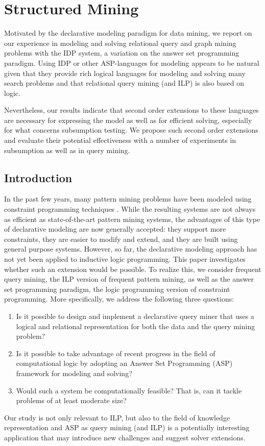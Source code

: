 \chapter{Structured Mining}\label{ch:StructuredMining}
  Motivated by the declarative modeling paradigm for data mining, we report on our experience in modeling and solving relational query and graph mining problems with the IDP system, a variation on the answer set programming paradigm. Using IDP or other ASP-languages for modeling appears to be natural given that they provide rich logical languages for modeling and solving many search problems and that relational query mining (and ILP) is also based on logic.

  Nevertheless, our results indicate that second order extensions to these languages are necessary for expressing the model as well as for efficient solving, especially for what concerns subsumption testing. We propose such second order extensions and evaluate their potential effectiveness with a number of experiments in subsumption as well as in query mining.




\section{Introduction}
\label{sec:intro}
In the past few years, many pattern mining problems have been modeled using constraint programming techniques \parencite{guns_framework}.
While the resulting systems are not always as efficient as state-of-the-art pattern mining systems,
the advantages of this type of declarative modeling are  now generally accepted: they support more constraints,
they are easier to modify and extend, and they are built using general purpose systems.
However, so far, the declarative modeling approach has not yet been applied to inductive logic programming. This paper investigates whether such 
an extension would be possible.  To realize this, we consider frequent query mining, the ILP version of frequent pattern mining, as well as the answer set programming paradigm, the logic programming version of constraint programming. 
More specifically, we address the following three questions: 

\begin{enumerate}
\item[\qone] Is it possible to design and implement a declarative query miner that uses a logical and relational representation for both the data and the query mining problem? 
\item[\qtwo] Is it possible to take advantage of recent progress in the field of computational logic by adopting an Answer Set Programming (ASP) \parencite{eiter} framework for modeling and solving? 
\item[\qthree] Would such a system be computationally feasible? That is, can it tackle problems of at least moderate size?
\end{enumerate}
Our study is not only relevant to ILP, but also to the field of knowledge representation and ASP
as query mining (and ILP) is a potentially interesting application 
that may introduce new challenges and suggest solver extensions. 


